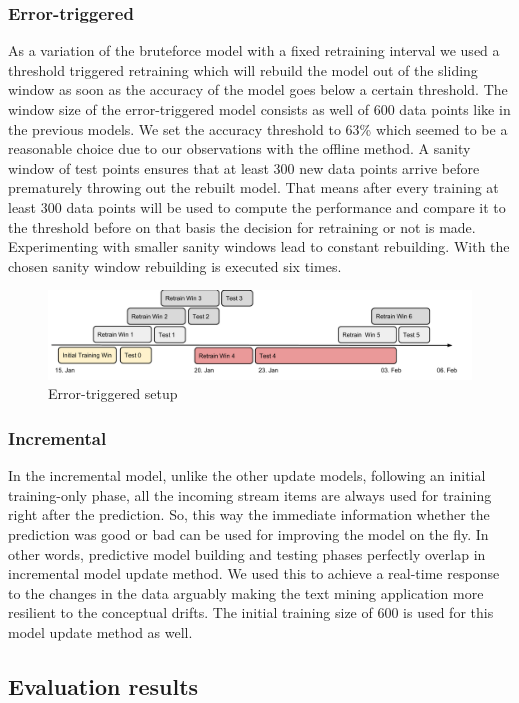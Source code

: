 \documentclass{article} %
\begin{document}
\subsubsection*{Error-triggered}
As a variation of the bruteforce model with a fixed retraining  interval we used a threshold triggered retraining which  will rebuild the model out of the sliding window as soon as the accuracy of the model goes below a certain threshold. The window size of
the error-triggered model consists as well of 600 data points like in the previous models. We set the accuracy threshold to 63\% which seemed to be a reasonable choice due to our observations with the offline method. A sanity window of test points ensures that at least 300 new data points arrive before prematurely throwing out the rebuilt model. That means after every training at least 300 data points will be used to compute the performance and compare it to the threshold before on that basis the decision for retraining or not is made. Experimenting with smaller sanity windows lead to constant rebuilding. With the chosen sanity window rebuilding is executed six times.
\begin{figure}[htbp]
  \centering
  \includegraphics[scale=0.25]{./time_models/Errortriggered.png}
  \caption{Error-triggered setup}
\end{figure}
\subsubsection*{Incremental}
In the incremental model, unlike the other update models, following an initial training-only phase, all the incoming stream items are always used for training right after the prediction. So, this way the immediate information whether the prediction was good or bad can be used for improving the model on the fly. In other words, predictive model building and testing phases perfectly overlap in incremental model update method. We used this to achieve a real-time response to the changes in the data arguably making the text mining application more resilient to the conceptual drifts. The initial training size of 600 is used for this model update method as well.

\subsection{Evaluation results}
\end{document}
